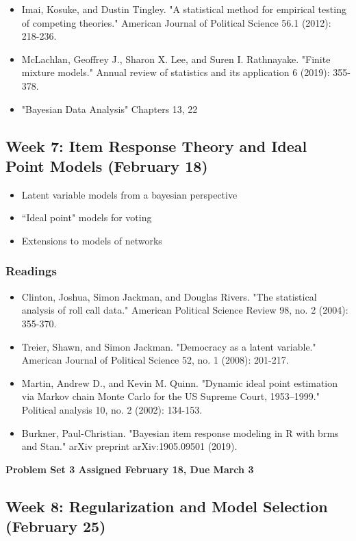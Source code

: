 \documentclass[11pt, article, oneside]{memoir}
\theoremstyle{Assumption}
\begin{document}
\begin{itemize}
\item Imai, Kosuke, and Dustin Tingley. "A statistical method for empirical testing of competing theories." American Journal of Political Science 56.1 (2012): 218-236.
\item McLachlan, Geoffrey J., Sharon X. Lee, and Suren I. Rathnayake. "Finite mixture models." Annual review of statistics and its application 6 (2019): 355-378.
\item "Bayesian Data Analysis" Chapters 13, 22
\end{itemize}

\subsection{Week 7: Item Response Theory and Ideal Point Models (February 18)}

\begin{itemize}
\item Latent variable models from a bayesian perspective
\item ``Ideal point" models for voting
\item Extensions to models of networks 
\end{itemize}

\subsubsection*{Readings}

\begin{itemize}
\item Clinton, Joshua, Simon Jackman, and Douglas Rivers. "The statistical analysis of roll call data." American Political Science Review 98, no. 2 (2004): 355-370.
\item Treier, Shawn, and Simon Jackman. "Democracy as a latent variable." American Journal of Political Science 52, no. 1 (2008): 201-217.
\item Martin, Andrew D., and Kevin M. Quinn. "Dynamic ideal point estimation via Markov chain Monte Carlo for the US Supreme Court, 1953–1999." Political analysis 10, no. 2 (2002): 134-153.
\item Burkner, Paul-Christian. "Bayesian item response modeling in R with brms and Stan." arXiv preprint arXiv:1905.09501 (2019).
\end{itemize}

\textbf{Problem Set 3 Assigned February 18, Due March 3}

\subsection{Week 8: Regularization and Model Selection (February 25)}
\end{document}
